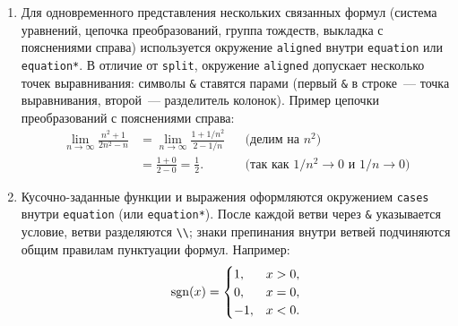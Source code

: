 \begin{enumerate}
    \item {}
        Для одновременного представления нескольких связанных формул (система уравнений, цепочка преобразований, группа тождеств, выкладка с пояснениями справа) используется окружение \verb|aligned| внутри \verb|equation| или \verb|equation*|.
        В отличие от \verb|split|, окружение \verb|aligned| допускает несколько точек выравнивания: символы \verb|&| ставятся парами (первый \verb|&| в строке~--- точка выравнивания, второй~--- разделитель колонок).
        Пример цепочки преобразований с пояснениями справа:
        \begin{equation*}
            \begin{aligned}
                \lim_{n \to \infty} \frac{n^2 + 1}{2n^2 - n}
                    & = \lim_{n \to \infty} \frac{1 + 1/n^2}{2 - 1/n}
                        && \text{(делим на $n^2$)} \\
                    & = \frac{1 + 0}{2 - 0} = \frac{1}{2}.
                        && \text{(так как $1/n^2 \to 0$ и $1/n \to 0$)}
            \end{aligned}
        \end{equation*}

    \item {}
        Кусочно-заданные функции и выражения оформляются окружением \verb|cases| внутри \verb|equation| (или \verb|equation*|).
        После каждой ветви через \verb|&| указывается условие, ветви разделяются \verb|\\|; знаки препинания внутри ветвей подчиняются общим правилам пунктуации формул.
        Например:
        \begin{equation*}
            \operatorname{sgn}(x) = \begin{cases}
                1,   & x > 0, \\
                 0,  & x = 0, \\
                -1,  & x < 0.
            \end{cases}
        \end{equation*}


\end{enumerate}
